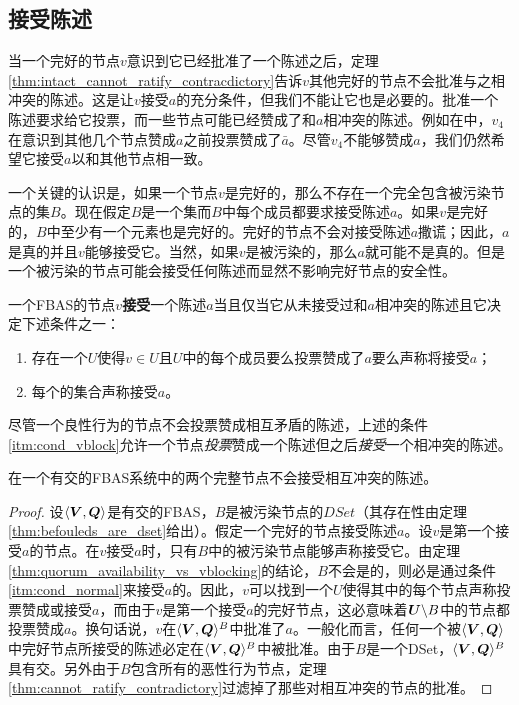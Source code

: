 \subsection{接受陈述}

当一个完好的节点$v$意识到它已经批准了一个陈述之后，定理\ref{thm:intact_cannot_ratify_contracdictory}告诉$v$其他完好的节点不会批准与之相冲突的陈述。这是让$v$接受$a$的充分条件，但我们不能让它也是必要的。批准一个陈述要求给它投票，而一些节点可能已经赞成了和$a$相冲突的陈述。例如在中，$v_4$在意识到其他几个节点赞成$a$之前投票赞成了$\bar a$。尽管$v_4$不能够赞成$a$，我们仍然希望它接受$a$以和其他节点相一致。

一个关键的认识是，如果一个节点$v$是完好的，那么不存在一个完全包含被污染节点的{\vblock}集$B$。现在假定$B$是一个{\vblock}集而$B$中每个成员都要求接受陈述$a$。如果$v$是完好的，$B$中至少有一个元素也是完好的。完好的节点不会对接受陈述$a$撒谎；因此，$a$是真的并且$v$能够接受它。当然，如果$v$是被污染的，那么$a$就可能不是真的。但是一个被污染的节点可能会接受任何陈述而显然不影响完好节点的安全性。

\begin{definition}[接受]
        一个FBAS的节点$v$\textbf{接受}一个陈述$a$当且仅当它从未接受过和$a$相冲突的陈述且它决定下述条件之一：
        \begin{enumerate}
                \item\label{itm:cond_normal} 存在一个{\quorum}$U$使得$v\in U$且$U$中的每个成员要么投票赞成了$a$要么声称将接受$a$；
                \item\label{itm:cond_vblock} 每个{\vblock}的集合声称接受$a$。 
        \end{enumerate}
\end{definition}

尽管一个良性行为的节点不会投票赞成相互矛盾的陈述，上述的条件\ref{itm:cond_vblock}允许一个节点\textit{投票}赞成一个陈述但之后\textit{接受}一个相冲突的陈述。

\begin{theorem}\label{th8}
        在一个有{\quorum}交的FBAS系统中的两个完整节点不会接受相互冲突的陈述。
\end{theorem}

\begin{proof}
        设$\langle{\bm V},{\bm Q}\rangle$是有{\quorum}交的FBAS，$B$是被污染节点的$DSet$（其存在性由定理\ref{thm:befouleds_are_dset}给出）。假定一个完好的节点接受陈述$a$。设$v$是第一个接受$a$的节点。在$v$接受$a$时，只有$B$中的被污染节点能够声称接受它。由定理\ref{thm:quorum_availability_vs_vblocking}的结论，$B$不会是{\vblock}的，则必是通过条件\ref{itm:cond_normal}来接受$a$的。因此，$v$可以找到一个{\quorum}$U$使得其中的每个节点声称投票赞成或接受$a$，而由于$v$是第一个接受$a$的完好节点，这必意味着${\bm U}\backslash B$中的节点都投票赞成$a$。换句话说，$v$在$\langle{\bm V},{\bm Q}\rangle^{B}$中批准了$a$。一般化而言，任何一个被$\langle{\bm V},{\bm Q}\rangle$中完好节点所接受的陈述必定在$\langle{\bm V},{\bm Q}\rangle^{B}$中被批准。由于$B$是一个DSet，$\langle{\bm V},{\bm Q}\rangle^{B}$具有{\quorum}交。另外由于$B$包含所有的恶性行为节点，定理\ref{thm:cannot_ratify_contradictory}过滤掉了那些对相互冲突的节点的批准。
\end{proof}